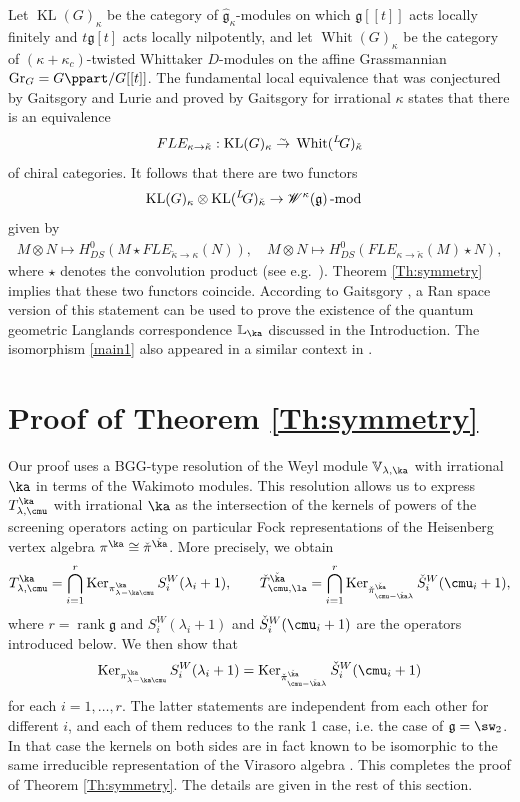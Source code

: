 \documentclass{amsart}
\newcommand{\V}{\mathbb{V}}
\newcommand{\on}{\operatorname}
\newcommand{\+}{\mathop{\oplus}}
\renewcommand{\*}{{\otimes}}
\newcommand{\mf}{\mathfrak}
\newcommand{\g}{\mf{g}}
\newcommand{\affg}{\widehat{\mf{g}}}
\newcommand{\isomap}{{\;\stackrel{_\sim}{\to}\;}}
\newcommand{\W}{\mathscr{W}}
\newcommand{\ra}{\rightarrow}
\newcommand{\lam}{\lambda}
\def\neg{\negthinspace}
\def\LG{{}^L\neg G}
\theoremstyle{theorem}
\theoremstyle{remark}
\numberwithin{equation}{section}
\begin{document}
Let $\on{KL}(G)_\kappa$ be the category of $\affg_{\kappa}$-modules on
which $\g[[t]]$ acts locally finitely
and $t\g[t]$ acts locally nilpotently, and let $\on{Whit}(G)_{\kappa}$
be the category of $(\kappa+\kappa_c)$-twisted Whittaker $D$-modules on
the affine Grassmannian $\on{Gr}_G=G\ppart/G[[t]]$.  The fundamental
local equivalence that was conjectured by Gaitsgory and Lurie
and proved by Gaitsgory for irrational $\kappa$ states that there is an
equivalence $$FLE_{\kappa\ra \check{\kappa}}:\on{KL}(G)_\kappa\isomap
\on{Whit}(\LG)_{\check{\kappa}}$$ of chiral categories.  It follows
that there are two functors
\begin{align*}
& \on{KL}(G)_\kappa\otimes  \on{KL}(\LG)_{\check{\kappa}} \ra
\W^\kappa(\g)\on{-mod}
\end{align*}
given by
\begin{align*}
M\otimes N\mapsto H_{DS}^0(M\star FLE_{\check{\kappa}\ra \kappa}(N)),\quad M\otimes N\mapsto
H_{DS}^0(FLE_{\kappa\ra \check{\kappa}}(M)\star N),
\end{align*}
where $\star$ denotes the convolution product (see e.g.\ \cite{FG06}).
Theorem \ref{Th:symmetry} implies that these two functors coincide.
According to Gaitsgory \cite{Gaitsgory:uo}, a Ran space version of
this statement can be used to prove the existence of the quantum
geometric Langlands correspondence $\mathbb{L}_\ka$ discussed in the
Introduction. The isomorphism \eqref{main1} also appeared in a similar
context in \cite{CreGai,FG}.

\section{Proof of Theorem \ref{Th:symmetry}}    \label{pr}

Our proof uses a BGG-type resolution of the Weyl module
$\V_{\lam,\ka}$ with irrational $\ka$ in terms of the Wakimoto
modules. This resolution allows us to express $T^\ka_{\lam,\cmu}$ with
irrational $\ka$ as the intersection of the kernels of powers of the
screening operators acting on particular Fock representations of the
Heisenberg vertex algebra $\pi^\ka \cong \check\pi^{\check\ka}$. More
precisely, we obtain
$$
T^\ka_{\lam,\cmu} = \bigcap_{i=1}^r \on{Ker}_{\pi^\ka_{\lam-\ka\cmu}}
S^W_{i}(\lam_i+1), \qquad \check{T}^{\check\ka}_{\cmu,\la} =
\bigcap_{i=1}^r \on{Ker}_{\check\pi^{\check\ka}_{\cmu-\check\ka\lam}}
\check{S}^W_{i}(\cmu_i+1),
$$
where $r=\on{rank}\g$ and $S^W_{i}(\lam_i+1)$ and
$\check{S}^W_{i}(\cmu_i+1)$ are the operators introduced below. We
then show that
$$
\on{Ker}_{\pi^\ka_{\lam-\ka\cmu}} S^W_{i}(\lam_i+1) =
\on{Ker}_{\check\pi^{\check\ka}_{\cmu-\check\ka\lam}}
\check{S}^W_{i}(\cmu_i+1)
$$
for each $i=1,\dots,r$. The latter statements are independent from
each other for different $i$, and each of them reduces to the rank 1
case, i.e. the case of $\g=\sw_2$. In that case the kernels on both
sides are in fact known to be isomorphic to the same irreducible
representation of the Virasoro algebra \cite{Kac,FeFu,TsuKan86}. This
completes the proof of Theorem \ref{Th:symmetry}. The details are
given in the rest of this section.
\end{document}
